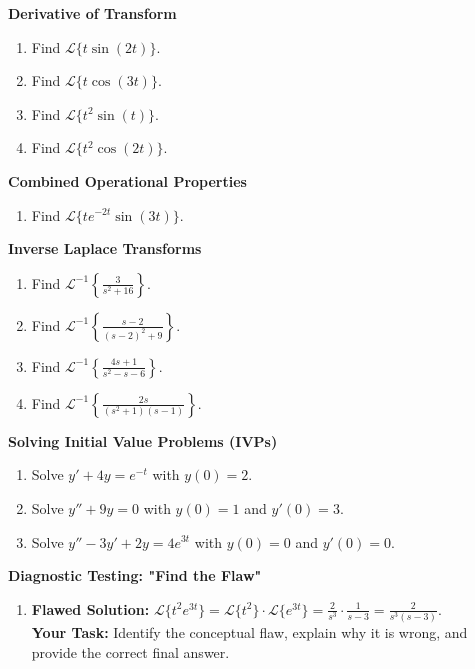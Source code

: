 \documentclass[11pt, letterpaper]{article}
\theoremstyle{definition}
\theoremstyle{remark}
\begin{document}
\textbf{Derivative of Transform}
\begin{enumerate}[label=\textbf{\arabic*.}, resume]
    \item Find $\mathscr{L}\{t\sin(2t)\}$.
    \item Find $\mathscr{L}\{t\cos(3t)\}$.
    \item Find $\mathscr{L}\{t^2\sin(t)\}$.
    \item Find $\mathscr{L}\{t^2\cos(2t)\}$.
\end{enumerate}

\textbf{Combined Operational Properties}
\begin{enumerate}[label=\textbf{\arabic*.}, resume]
    \item Find $\mathscr{L}\{t e^{-2t} \sin(3t)\}$.
\end{enumerate}

\textbf{Inverse Laplace Transforms}
\begin{enumerate}[label=\textbf{\arabic*.}, resume]
    \item Find $\mathscr{L}^{-1}\left\{\frac{3}{s^2 + 16}\right\}$.
    \item Find $\mathscr{L}^{-1}\left\{\frac{s - 2}{(s-2)^2 + 9}\right\}$.
    \item Find $\mathscr{L}^{-1}\left\{\frac{4s + 1}{s^2 - s - 6}\right\}$.
    \item Find $\mathscr{L}^{-1}\left\{\frac{2s}{(s^2 + 1)(s-1)}\right\}$.
\end{enumerate}

\textbf{Solving Initial Value Problems (IVPs)}
\begin{enumerate}[label=\textbf{\arabic*.}, resume]
    \item Solve $y' + 4y = e^{-t}$ with $y(0) = 2$.
    \item Solve $y'' + 9y = 0$ with $y(0) = 1$ and $y'(0) = 3$.
    \item Solve $y'' - 3y' + 2y = 4e^{3t}$ with $y(0) = 0$ and $y'(0) = 0$.
\end{enumerate}

\textbf{Diagnostic Testing: "Find the Flaw"}
\begin{enumerate}[label=\textbf{\arabic*.}, resume]
    \item \textbf{Flawed Solution:} $\mathscr{L}\{t^2 e^{3t}\} = \mathscr{L}\{t^2\} \cdot \mathscr{L}\{e^{3t}\} = \frac{2}{s^3} \cdot \frac{1}{s-3} = \frac{2}{s^3(s-3)}$. \\
    \textbf{Your Task:} Identify the conceptual flaw, explain why it is wrong, and provide the correct final answer.
\end{enumerate}
\end{document}
